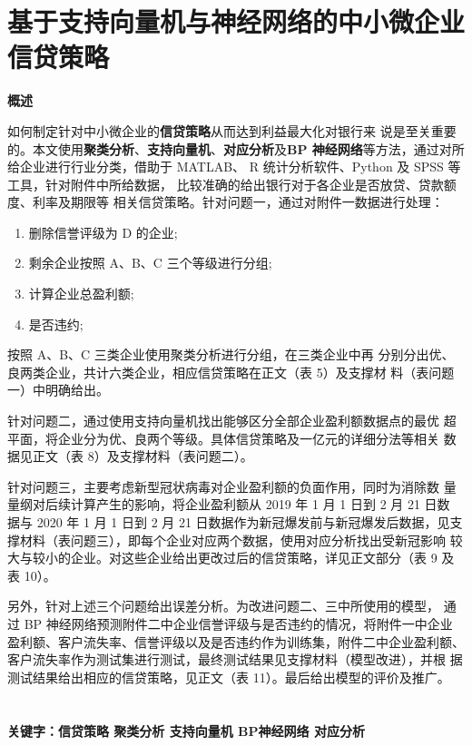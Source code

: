 \documentclass{article}
\begin{document}
    \section*{基于支持向量机与神经网络的中小微企业信贷策略}
    \begin{center}
        \textbf{概述}    
    \end{center}\par
    如何制定针对中小微企业的\textbf{信贷策略}从而达到利益最大化对银行来
    说是至关重要的。本文使用\textbf{聚类分析}、\textbf{支持向量机}、\textbf{对应分析}及\textbf{BP
    神经网络}等方法，通过对所给企业进行行业分类，借助于 MATLAB、
    R 统计分析软件、Python 及 SPSS 等工具，针对附件中所给数据，
    比较准确的给出银行对于各企业是否放贷、贷款额度、利率及期限等
    相关信贷策略。针对问题一，通过对附件一数据进行处理：
    \begin{enumerate}
        \item 删除信誉评级为 D 的企业;
        \item 剩余企业按照 A、B、C 三个等级进行分组;
        \item 计算企业总盈利额;
        \item 是否违约;
    \end{enumerate}\par
    按照 A、B、C 三类企业使用聚类分析进行分组，在三类企业中再
分别分出优、良两类企业，共计六类企业，相应信贷策略在正文（表 5）及支撑材
料（表问题一）中明确给出。\par
针对问题二，通过使用支持向量机找出能够区分全部企业盈利额数据点的最优
超平面，将企业分为优、良两个等级。具体信贷策略及一亿元的详细分法等相关
数据见正文（表 8）及支撑材料（表问题二）。\par
针对问题三，主要考虑新型冠状病毒对企业盈利额的负面作用，同时为消除数
量量纲对后续计算产生的影响，将企业盈利额从 2019 年 1 月 1 日到 2 月 21 日数
据与 2020 年 1 月 1 日到 2 月 21 日数据作为新冠爆发前与新冠爆发后数据，见支
撑材料（表问题三），即每个企业对应两个数据，使用对应分析找出受新冠影响
较大与较小的企业。对这些企业给出更改过后的信贷策略，详见正文部分（表 9
及表 10）。\par
另外，针对上述三个问题给出误差分析。为改进问题二、三中所使用的模型，
通过 BP 神经网络预测附件二中企业信誉评级与是否违约的情况，将附件一中企业
盈利额、客户流失率、信誉评级以及是否违约作为训练集，附件二中企业盈利额、
客户流失率作为测试集进行测试，最终测试结果见支撑材料（模型改进），并根
据测试结果给出相应的信贷策略，见正文（表 11）。最后给出模型的评价及推广。
\\\\\\
\textbf{关键字：信贷策略 聚类分析 支持向量机 BP神经网络 对应分析}\newpage
\end{document}
